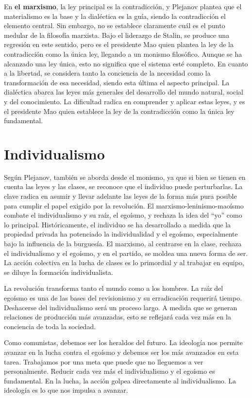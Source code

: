 \documentclass[
  a4paper,
]{article}
\begin{document}
En \textbf{el marxismo}, la ley principal es la contradicción, y
Plejanov plantea que el materialismo es la base y la dialéctica es la
guía, siendo la contradicción el elemento central. Sin embargo, no se
establece claramente cuál es el punto medular de la filosofía marxista.
Bajo el liderazgo de Stalin, se produce una regresión en este sentido,
pero es el presidente Mao quien plantea la ley de la contradicción como
la única ley, llegando a un monismo filosófico. Aunque se ha alcanzado
una ley única, esto no significa que el sistema esté completo. En cuanto
a la libertad, se considera tanto la conciencia de la necesidad como la
transformación de esa necesidad, siendo esta última el aspecto
principal. La dialéctica abarca las leyes más generales del desarrollo
del mundo natural, social y del conocimiento. La dificultad radica en
comprender y aplicar estas leyes, y es el presidente Mao quien establece
la ley de la contradicción como la única ley fundamental.

\hypertarget{individualismo}{%
\section{Individualismo}\label{individualismo}}

Según Plejanov, también se aborda desde el monismo, ya que si bien se
tienen en cuenta las leyes y las clases, se reconoce que el individuo
puede perturbarlas. La clave radica en asumir y llevar adelante las
leyes de la forma más pura posible para cumplir el papel exigido por la
revolución. El marxismo-leninismo-maoísmo combate el individualismo y su
raíz, el egoísmo, y rechaza la idea del ``yo'' como lo principal.
Históricamente, el individuo se ha desarrollado a medida que la
propiedad privada ha potenciado la individualidad y el egoísmo,
especialmente bajo la influencia de la burguesía. El marxismo, al
centrarse en la clase, rechaza el individualismo y el egoísmo, y en el
partido, se moldea una nueva forma de ser. La acción colectiva en la
lucha de clases es lo primordial y al trabajar en equipo, se diluye la
formación individualista.

La revolución transforma tanto el mundo como a los hombres. La raíz del
egoísmo es una de las bases del revisionismo y su erradicación requerirá
tiempo. Deshacerse del individualismo será un proceso largo. A medida
que se generan relaciones de producción más avanzadas, esto se reflejará
cada vez más en la conciencia de toda la sociedad.

Como comunistas, debemos ser los heraldos del futuro. La ideología nos
permite avanzar en la lucha contra el egoísmo y debemos ser los más
avanzados en esta tarea. Trabajamos por una meta que puede que no
lleguemos a ver personalmente. Reducir cada vez más el individualismo y
el egoísmo es fundamental. En la lucha, la acción golpea directamente al
individualismo. La ideología es lo que nos impulsa a avanzar.


\printbibliography
\end{document}
